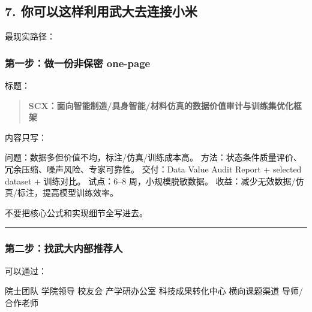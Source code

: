 \documentclass[
  12pt,
]{ctexart}
\newenvironment{Shaded}{}{}
\newcommand{\NormalTok}[1]{#1}
\begin{document}
\subsection{7.
你可以这样利用武大去连接小米}\label{ux4f60ux53efux4ee5ux8fd9ux6837ux5229ux7528ux6b66ux5927ux53bbux8fdeux63a5ux5c0fux7c73}

最现实路径：

\subsubsection{第一步：做一份非保密
one-page}\label{ux7b2cux4e00ux6b65ux505aux4e00ux4efdux975eux4fddux5bc6-one-page}

标题：

\begin{quote}
\textbf{SCX：面向智能制造/具身智能/材料仿真的数据价值审计与训练集优化框架}
\end{quote}

内容只写：

\begin{Shaded}
\begin{Highlighting}[]
\NormalTok{问题：数据多但价值不均，标注/仿真/训练成本高。}
\NormalTok{方法：状态条件质量评价、冗余压缩、噪声风险、专家可靠性。}
\NormalTok{交付：Data Value Audit Report + selected dataset + 训练对比。}
\NormalTok{试点：6–8 周，小规模脱敏数据。}
\NormalTok{收益：减少无效数据/仿真/标注，提高模型训练效率。}
\end{Highlighting}
\end{Shaded}

不要把核心公式和实现细节全写进去。

\begin{center}\rule{0.5\linewidth}{0.5pt}\end{center}

\subsubsection{第二步：找武大内部推荐人}\label{ux7b2cux4e8cux6b65ux627eux6b66ux5927ux5185ux90e8ux63a8ux8350ux4eba}

可以通过：

\begin{Shaded}
\begin{Highlighting}[]
\NormalTok{院士团队}
\NormalTok{学院领导}
\NormalTok{校友会}
\NormalTok{产学研办公室}
\NormalTok{科技成果转化中心}
\NormalTok{横向课题渠道}
\NormalTok{导师/合作老师}
\end{Highlighting}
\end{Shaded}
\end{document}

